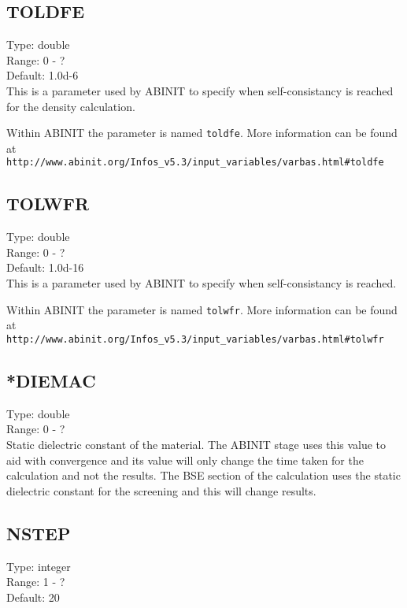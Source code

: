 \documentclass[12pt]{article}
\begin{document}
\subsection{TOLDFE}
Type: double \\
Range: 0 - ? \\
Default: 1.0d-6\\

This is a parameter used by \textsc{ABINIT} to specify when 
self-consistancy is reached for the density calculation.

Within \textsc{ABINIT} the parameter is named \verb|toldfe|.
More information can be found at 
\\
\verb|http://www.abinit.org/Infos_v5.3/input_variables/varbas.html#toldfe|

\subsection{TOLWFR}
Type: double \\
Range: 0 - ? \\
Default: 1.0d-16 \\

This is a parameter used by \textsc{ABINIT} to specify when 
self-consistancy is reached. 

Within \textsc{ABINIT} the parameter is named \verb|tolwfr|.
More information can be found at 
\\ 
\verb|http://www.abinit.org/Infos_v5.3/input_variables/varbas.html#tolwfr|

\subsection{*DIEMAC}
Type: double \\
Range: 0 - ? \\

Static dielectric constant of the material. The \textsc{ABINIT} stage uses this value to aid with convergence and its value will only change the time taken for the calculation and not the results. The BSE section of 
the calculation uses the static dielectric constant for the screening and this will change results.

\subsection{NSTEP}
Type: integer \\
Range: 1 - ? \\
Default: 20  \\
\end{document}
